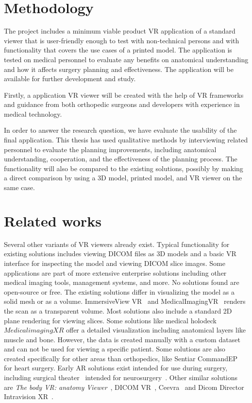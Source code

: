 \documentclass[a4paper]{report}
\begin{document}
\section{Methodology}

The project includes a minimum viable product VR application of a standard viewer that is user-friendly enough to test with non-technical persons and with functionality that covers the use cases of a printed model.
The application is tested on medical personnel to evaluate any benefits on anatomical understanding and how it affects surgery planning and effectiveness. The application will be available for further development and study.

Firstly, a application VR viewer will be created with the help of VR frameworks and guidance from both orthopedic surgeons and developers with experience in medical technology.

In order to answer the research question, we have evaluate the usability of the final application. This thesis has used qualitative methods
by interviewing related personnel to evaluate the planning improvements, including anatomical understanding, cooperation, and the effectiveness of the planning process.
The functionality will also be compared to the existing solutions, possibly by making a direct comparison by using a 3D model, printed model, and VR viewer
on the same case.

\section{Related works}

Several other variants of VR viewers already exist. Typical functionality for existing solutions includes viewing DICOM files as 3D models and a basic VR interface for inspecting the model and viewing DICOM slice images. Some applications are part of more extensive enterprise solutions including other medical imaging tools, management systems, and more. No solutions found are open-source or free.
The existing solutions differ in visualizing the model as a solid mesh or as a volume. ImmersiveView VR~\cite{noauthor_immersiveview_nodate} and MedicalImagingVR~\cite{noauthor_medicalimagingvr_nodate} renders the scan as a transparent volume. Most solutions also include a standard 2D plane rendering for viewing slices.
Some solutions like medical holodeck~\cite{medical_holodeck_medicalholodeck_nodate} $Medical imaging XR$ offer a detailed visualization including anatomical layers like muscle and bone. However, the data is created manually with a custom dataset and can not be used for viewing a specific patient.
Some solutions are also created specifically for other areas than orthopedics, like Sentiar CommandEP~\cite{noauthor_commandep_nodate} for heart surgery.
Early AR solutions exist intended for use during surgery, including surgical theater~\cite{noauthor_virtual_nodate} intended for neurosurgery~\cite{anthony_patient-specific_2021}.
Other similar solutions are \emph{The body VR: anatomy Viewer}~\cite{noauthor_body_nodate}, DICOM VR~\cite{noauthor_dicom_nodate-1}, Ceevra~\cite{ceevra_inc_using_2019} and Dicom Director Intravision XR~\cite{dicomdirectorcom_surgeons_nodate}.
\end{document}
